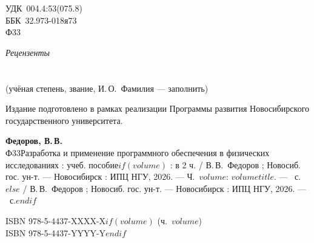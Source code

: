 \documentclass[12pt,oneside]{book}
\begin{document}
\thispagestyle{empty}
\setlength{\parindent}{0pt}
{\small
УДК~004.4:53(075.8)\\
ББК~32.973-018я73\\
Ф33
\vspace{6mm}

\textit{Рецензенты}\\
\underline{\hspace{55mm}}\\[1pt]
\underline{\hspace{55mm}}\\[1pt]
{\footnotesize (учёная степень, звание, И.\,О.~Фамилия --- заполнить)}
\vspace{4mm}

Издание подготовлено в рамках реализации Программы развития
Новосибирского государственного университета.
\vspace{4mm}

\textbf{Федоров, В.\,В.}\\
Ф33\quad Разработка и применение программного обеспечения в физических
исследованиях : учеб. пособие$if(volume)$ : в 2 ч. / В.\,В.~Федоров ;
Новосиб. гос. ун-т. --- Новосибирск : ИПЦ НГУ, 2026. ---
Ч.~$volume$: $volumetitle$. --- \pageref{LastPage}~с.$else$ /
В.\,В.~Федоров ; Новосиб. гос. ун-т. --- Новосибирск : ИПЦ НГУ, 2026.
--- \pageref{LastPage}~с.$endif$
\vspace{3mm}

ISBN 978-5-4437-XXXX-X$if(volume)$ (ч.~$volume$)\\
ISBN 978-5-4437-YYYY-Y$endif$
\vspace{4mm}

}
\end{document}
